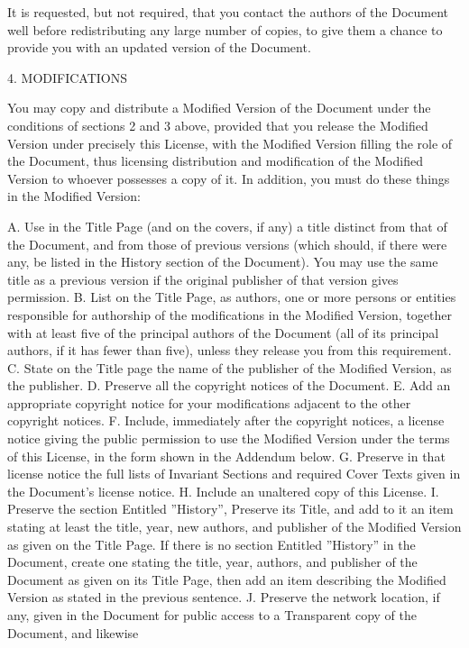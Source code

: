 It is requested, but not required, that you contact the authors of the Document well before redistributing any large
number of copies, to give them a chance to provide you with an updated version of the Document.

4. MODIFICATIONS

You may copy and distribute a Modified Version of the Document under the conditions of sections 2 and 3 above, provided
that you release the Modified Version under precisely this License, with the Modified Version filling the role of the
Document, thus licensing distribution and modification of the Modified Version to whoever possesses a copy of it. In
addition, you must do these things in the Modified Version:


A. Use in the Title Page (and on the covers, if any) a title distinct from that of the Document, and from those of
previous versions (which should, if there were any, be listed in the History section of the Document). You may use the
same title as a previous version if the original publisher of that version gives permission. B. List on the Title Page,
as authors, one or more persons or entities responsible for authorship of the modifications in the Modified Version,
together with at least five of the principal authors of the Document (all of its principal authors, if it has fewer
than five), unless they release you from this requirement. C. State on the Title page the name of the publisher of the
Modified Version, as the publisher. D. Preserve all the copyright notices of the Document. E. Add an appropriate
copyright notice for your modifications adjacent to the other copyright notices. F. Include, immediately after the
copyright notices, a license notice giving the public permission to use the Modified Version under the terms of this
License, in the form shown in the Addendum below. G. Preserve in that license notice the full lists of Invariant
Sections and required Cover Texts given in the Document's license notice. H. Include an unaltered copy of this License.
I. Preserve the section Entitled ''History'', Preserve its Title, and add to it an item stating at least the title,
year, new authors, and publisher of the Modified Version as given on the Title Page. If there is no section Entitled
''History'' in the Document, create one stating the title, year, authors, and publisher of the Document as given on its
Title Page, then add an item describing the Modified Version as stated in the previous sentence. J. Preserve the
network location, if any, given in the Document for public access to a Transparent copy of the Document, and likewise
